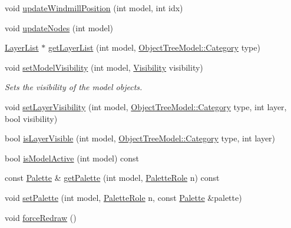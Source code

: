 \begin{DoxyCompactItemize}
void \mbox{\hyperlink{class_map_objects_controller_a6aaeadbd4e451698641bf61e926a2ae1}{update\+Windmill\+Position}} (int model, int idx)
\item 
void \mbox{\hyperlink{class_map_objects_controller_a30ab0cf188279013864a623eeb458a98}{update\+Nodes}} (int model)
\item 
\mbox{\hyperlink{class_map_objects_controller_1_1_layer_list}{Layer\+List}} $\ast$ \mbox{\hyperlink{class_map_objects_controller_ad6f051f3641febd5bba8d2229749cae5}{get\+Layer\+List}} (int model, \mbox{\hyperlink{class_object_tree_model_a379e9d6b0d381853785adf62095ba4e3}{Object\+Tree\+Model\+::\+Category}} type)
\item 
void \mbox{\hyperlink{class_map_objects_controller_a42fbe3d3a5e2971b4b2bfdbf17479fc7}{set\+Model\+Visibility}} (int model, \mbox{\hyperlink{class_map_objects_controller_ae9f927453172ea1c7eca82b05054bc35}{Visibility}} visibility)
\begin{DoxyCompactList}\small\item\em Sets the visibility of the model objects. \end{DoxyCompactList}\item 
void \mbox{\hyperlink{class_map_objects_controller_aee5c8de6a25dd4ede075b97bc5b01d9f}{set\+Layer\+Visibility}} (int model, \mbox{\hyperlink{class_object_tree_model_a379e9d6b0d381853785adf62095ba4e3}{Object\+Tree\+Model\+::\+Category}} type, int layer, bool visibility)
\item 
bool \mbox{\hyperlink{class_map_objects_controller_a43e7f38c765425568a1ab4538c06c873}{is\+Layer\+Visible}} (int model, \mbox{\hyperlink{class_object_tree_model_a379e9d6b0d381853785adf62095ba4e3}{Object\+Tree\+Model\+::\+Category}} type, int layer)
\item 
bool \mbox{\hyperlink{class_map_objects_controller_a96ec035b0d07fe169a98476a0e8de8d0}{is\+Model\+Active}} (int model) const
\item 
const \mbox{\hyperlink{class_palette}{Palette}} \& \mbox{\hyperlink{class_map_objects_controller_a0472ad25b047df17413575e7e36dbf68}{get\+Palette}} (int model, \mbox{\hyperlink{palettemanager_8h_adf4610684920d9165d0d74c1ea45b269}{Palette\+Role}} n) const
\item 
void \mbox{\hyperlink{class_map_objects_controller_ab4c6e12f9ac0b3ffe0f9f4137e76aa64}{set\+Palette}} (int model, \mbox{\hyperlink{palettemanager_8h_adf4610684920d9165d0d74c1ea45b269}{Palette\+Role}} n, const \mbox{\hyperlink{class_palette}{Palette}} \&palette)
\item 
void \mbox{\hyperlink{class_map_objects_controller_a7b82d7cdb68215582c1aff8732b9301e}{force\+Redraw}} ()

\end{DoxyCompactItemize}
